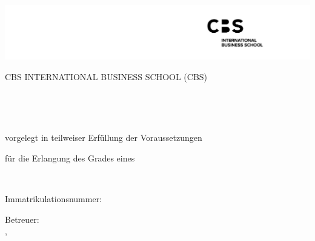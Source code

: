 \begin{titlepage}

	\frontmatter

	\begin{center}
    \includegraphics[width=\textwidth]{abbildungen/cbslogo} \\
    \vspace{2cm}
		
		\textsc{\large CBS INTERNATIONAL BUSINESS SCHOOL (CBS)}\\
		\vspace{2cm}
						
		\textbf{\LARGE{\DeutschesThema}}\\
		\vspace{3cm}
		
		
		\textsc{\textbf{\ArtDerArbeit}}\\
		\vspace{0.5cm}
		
		vorgelegt in teilweiser Erf{\"u}llung der Voraussetzungen \\
		\vspace{0.5cm}
		
		f{\"u}r die Erlangung des Grades eines  \\
		\vspace{0.5cm}
		
		\textsc{\textbf{\Abschluss}}\\
		\vspace{2cm}
	
	\end{center}
		
	
	\Autor 
	
	Immatrikulationsnummer: \Immatrikulationsnummer \\
	\vspace{3cm}


	Betreuer: \Betreuer \\

	\Wohnort{}, \Datum \\

	
\end{titlepage}

